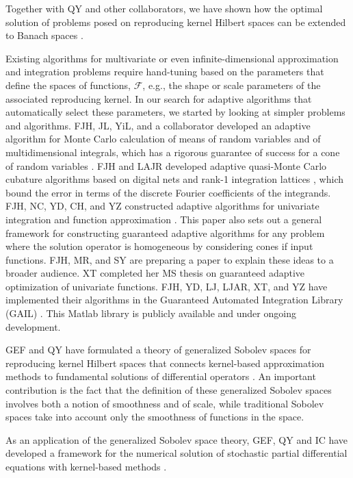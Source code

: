 \documentclass[11pt]{NSFamsart}
\newcommand{\calf}{{\mathcal{F}}}
\newcommand{\Matlab}{{\sc Matlab}\xspace}
\begin{document}
Together with QY and other collaborators, we have shown how the optimal solution of problems posed on reproducing kernel Hilbert spaces can be extended to Banach spaces \citep{SonZhaHic12a, FasHicYe13a}.

Existing algorithms for multivariate or even infinite-dimensional approximation and integration problems require hand-tuning based on the parameters that define the spaces of functions, $\calf$, e.g., the shape or scale parameters of the associated reproducing kernel.  In our search for adaptive algorithms that automatically select these parameters, we started by looking at simpler problems and algorithms.  FJH, JL, YiL, and a collaborator developed an  adaptive algorithm for Monte Carlo calculation of means of random variables and of multidimensional integrals, which has a rigorous guarantee of success for a cone of random variables \citep{HicEtal14a}.  FJH and LAJR developed adaptive quasi-Monte Carlo cubature algorithms based on digital nets \citep{HicJim16a} and rank-1 integration lattices \citep{JimHic16a}, which bound the error in terms of the discrete Fourier coefficients of the integrands.
FJH, NC, YD, CH, and YZ constructed adaptive algorithms for univariate integration and function approximation \citep{HicEtal14b}.  This paper also sets out a general framework for constructing guaranteed adaptive algorithms for any problem where the solution operator is homogeneous by considering cones if input functions.  FJH, MR, and SY are preparing a paper to explain these ideas to a broader audience.  XT completed her MS thesis \citep{Ton14a} on guaranteed adaptive optimization of univariate functions.
FJH, YD, LJ, LJAR, XT, and YZ have implemented their algorithms in the Guaranteed Automated Integration Library (GAIL) \citep{ChoEtal14a}.  This \Matlab library is publicly available and under ongoing development.

GEF and QY have formulated a theory of generalized Sobolev spaces for reproducing kernel Hilbert spaces that connects kernel-based approximation methods to fundamental solutions of differential operators \cite{FasshauerYe11, FasshauerYe13}. An important contribution is the fact that the definition of these generalized Sobolev spaces involves both a notion of smoothness and of scale, while traditional Sobolev spaces take into account only the smoothness of functions in the space.

As an application of the generalized Sobolev space theory, GEF, QY and IC have developed a framework for the numerical solution of stochastic partial differential equations with kernel-based methods \citep{CFY12,FasshauerYe13b,FasshauerYe14}.
\end{document}
